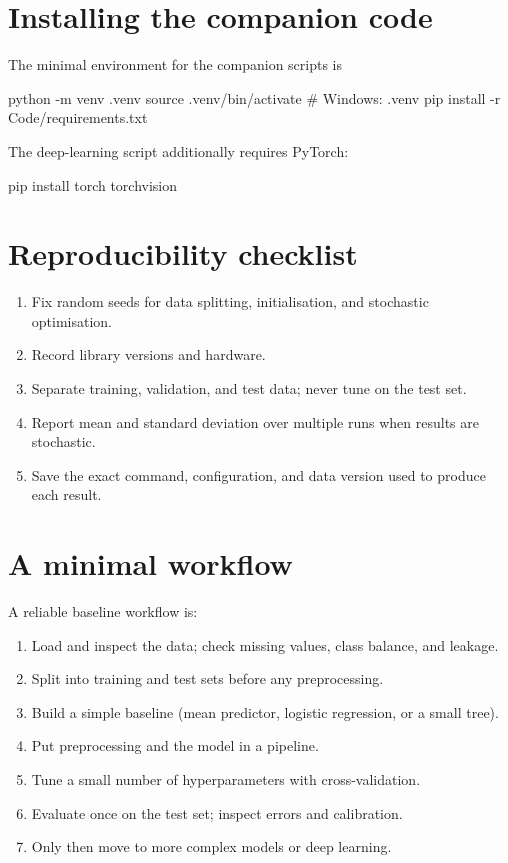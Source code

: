 \documentclass[a4paper, 12pt]{book}
\begin{document}
\section{Installing the companion code}

The minimal environment for the companion scripts is
\begin{pycode}
python -m venv .venv
source .venv/bin/activate        # Windows: .venv\Scripts\activate
pip install -r Code/requirements.txt
\end{pycode}
The deep-learning script additionally requires PyTorch:
\begin{pycode}
pip install torch torchvision
\end{pycode}

\section{Reproducibility checklist}

\begin{enumerate}
    \item Fix random seeds for data splitting, initialisation, and stochastic
    optimisation.
    \item Record library versions and hardware.
    \item Separate training, validation, and test data; never tune on the test set.
    \item Report mean and standard deviation over multiple runs when results are
    stochastic.
    \item Save the exact command, configuration, and data version used to produce each
    result.
\end{enumerate}

\section{A minimal workflow}

A reliable baseline workflow is:
\begin{enumerate}
    \item Load and inspect the data; check missing values, class balance, and leakage.
    \item Split into training and test sets before any preprocessing.
    \item Build a simple baseline (mean predictor, logistic regression, or a small
    tree).
    \item Put preprocessing and the model in a pipeline.
    \item Tune a small number of hyperparameters with cross-validation.
    \item Evaluate once on the test set; inspect errors and calibration.
    \item Only then move to more complex models or deep learning.
\end{enumerate}
\end{document}
